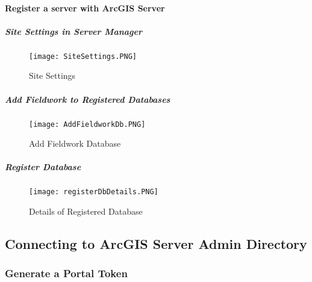 %
%
%
%
% 
%

\paragraph{Register a server with ArcGIS Server}

\subparagraph{Site Settings in Server Manager}


 \begin{figure}[h!]
 \centering
     \texttt{[image: SiteSettings.PNG]}
 \caption{Site Settings}
 \end{figure}

 \clearpage

\subparagraph{Add Fieldwork to Registered Databases}

 \begin{figure}[h!]
 \centering
     \texttt{[image: AddFieldworkDb.PNG]}
 \caption{Add Fieldwork Database}
 \end{figure}


 \clearpage

\subparagraph{Register Database}


 \begin{figure}[h!]
 \centering
     \texttt{[image: registerDbDetails.PNG]}
 \caption{Details of Registered Database}
 \end{figure}


 \clearpage



\subsection{Connecting to ArcGIS Server Admin Directory}

\subsubsection{Generate a Portal Token}

